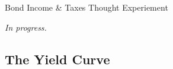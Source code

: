 \documentclass[10pt]{article}
\begin{document}
    \begin{core}{Bond Income \& Taxes Thought Experiement}

      \textit{In progress.}


    \end{core}

  \subsection{The Yield Curve}
\end{document}
